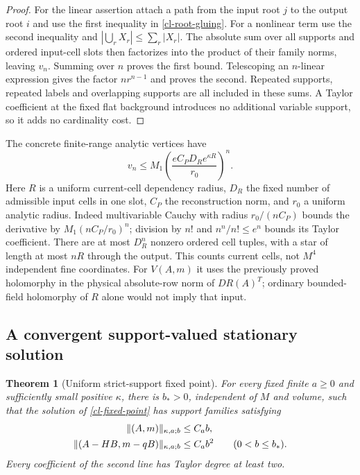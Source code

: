 \documentclass[11pt]{article}
\newtheorem{theorem}{Theorem}
\theoremstyle{remark}\newtheorem{remark}[theorem]{Remark}
\begin{document}
\begin{proof}
For the linear assertion attach a path from the input root $j$ to the
output root $i$ and use the first inequality in
\eqref{cl-root-gluing}. For a nonlinear term use the second inequality
and
$|\bigcup_rX_r|\le\sum_r|X_r|$.
The absolute sum over all supports and ordered input-cell slots then
factorizes into the product of their family norms, leaving $v_n$.
Summing over $n$ proves the first bound. Telescoping an $n$-linear
expression gives the factor $n r^{n-1}$ and proves the second.
Repeated supports, repeated labels and overlapping supports are all
included in these sums. A Taylor coefficient at the fixed flat
background introduces no additional variable support, so it adds no
cardinality cost.
\end{proof}

The concrete finite-range analytic vertices have
\begin{equation}
 v_n\le M_1
       \left(\frac{eC_PD_Re^{\kappa R}}{r_0}\right)^n.        \label{cl-local-cauchy}
\end{equation}
Here $R$ is a uniform current-cell dependency radius, $D_R$ the fixed
number of admissible input cells in one slot, $C_P$ the reconstruction
norm, and $r_0$ a uniform analytic radius. Indeed multivariable Cauchy
with radius $r_0/(nC_P)$ bounds the derivative by
$M_1(nC_P/r_0)^n$; division by $n!$ and $n^n/n!\le e^n$ bounds its
Taylor coefficient. There are at most $D_R^n$ nonzero ordered cell
tuples, with a star of length at most $nR$ through the output.
This counts current cells, not $M^4$ independent fine coordinates.
For $V(A,m)$ it uses the previously proved holomorphy in the physical
absolute-row norm of $DR(A)^T$; ordinary bounded-field holomorphy of
$R$ alone would not imply that input.

\subsection{A convergent support-valued stationary solution}
\label{cl-contraction-section}

\begin{theorem}[Uniform strict-support fixed point]
\label{cl-fixed-point-theorem}
For every fixed finite $a\ge0$ and sufficiently small positive
$\kappa$, there is $b_*>0$, independent of $M$ and volume, such that
the solution of \eqref{cl-fixed-point} has support families satisfying
\begin{align}
 \|(A,m)\|_{\kappa,a;b}&\le C_a b,\notag\\
 \|(A-HB,m-qB)\|_{\kappa,a;b}&\le C_a b^2
 \qquad(0<b\le b_*).                                      \label{cl-solution-bound}
\end{align}
Every coefficient of the second line has Taylor degree at least two.
\end{theorem}
\end{document}
